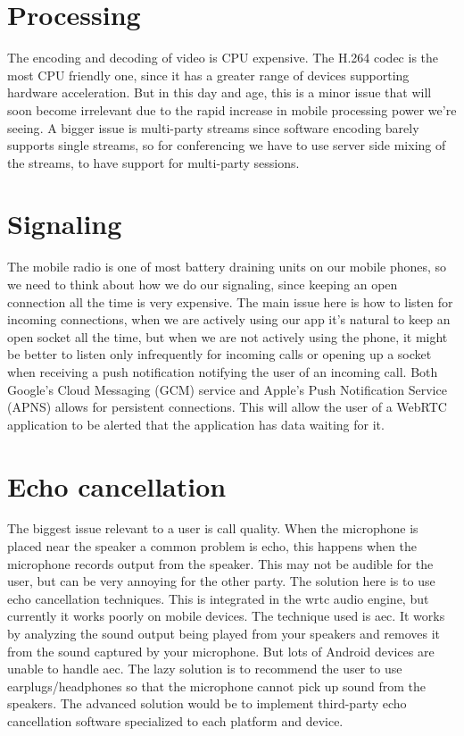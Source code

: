 \section{Processing}
The encoding and decoding of video is CPU expensive. The H.264 codec is the most CPU friendly one, since it has a greater range of devices supporting hardware acceleration. But in this day and age, this is a minor issue that will soon become irrelevant due to the rapid increase in mobile processing power we're seeing\cite{moores-law}. A bigger issue is multi-party streams since software encoding barely supports single streams\cite{webrtc-mobile-slides}, so for conferencing we have to use server side mixing of the streams, to have support for multi-party sessions.


\section{Signaling}
The mobile radio is one of most battery draining units on our mobile phones, so we need to think about how we do our signaling, since keeping an open connection all the time is very expensive. The main issue here is how to listen for incoming connections, when we are actively using our app it's natural to keep an open socket all the time, but when we are not actively using the phone, it might be better to listen only infrequently for incoming calls or opening up a socket when receiving a push notification notifying the user of an incoming call. Both Google's Cloud Messaging (GCM) service and Apple's Push Notification Service (APNS) allows for persistent connections. This will allow the user of a WebRTC application to be alerted that the application has data waiting for it.


\section{Echo cancellation}
The biggest issue relevant to a user is call quality. When the microphone is placed near the speaker a common problem is echo, this happens when the microphone records output from the speaker. This may not be audible for the user, but can be very annoying for the other party. The solution here is to use echo cancellation techniques. This is integrated in the \gls{wrtc} audio engine, but currently it works poorly on mobile devices. The technique used is \gls{aec}. It works by analyzing the sound output being played from your speakers and removes it from the sound captured by your microphone. But lots of Android devices are unable to handle \gls{aec}\cite{echo-problems-mobile}. The lazy solution is to recommend the user to use earplugs/headphones so that the microphone cannot pick up sound from the speakers. The advanced solution would be to implement third-party echo cancellation software specialized to each platform and device.


